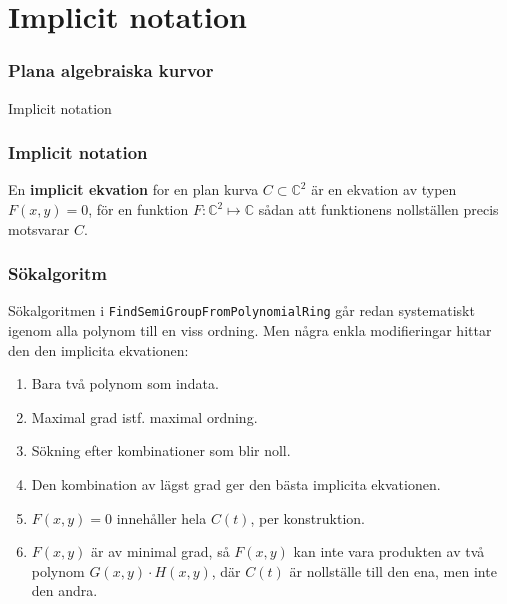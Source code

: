\documentclass{beamer}
\begin{document}
\section{Implicit notation}

\begin{frame}
	\frametitle{Plana algebraiska kurvor}
	\begin{center}
		\Large Implicit notation
	\end{center}
\end{frame}

\begin{frame}
	\frametitle{Implicit notation}
	
	\begin{definition}
		En \textbf{implicit ekvation} for en plan kurva $C \subset \mathbb{C}^2$ är en ekvation av typen $F(x,y)=0$, för en funktion $F: \mathbb{C}^2 \mapsto \mathbb{C}$ sådan att funktionens nollställen precis motsvarar $C$.
	\end{definition}
		
	\vspace{20pt}
\end{frame}

\begin{frame}
	\frametitle{Sökalgoritm}
	
	Sökalgoritmen i \texttt{FindSemiGroupFromPolynomialRing} går redan systematiskt igenom alla polynom till en viss ordning. Men några enkla modifieringar hittar den den implicita ekvationen:
	
	\begin{enumerate}
		\item<2->Bara två polynom som indata.
		\item<3->Maximal grad istf. maximal ordning.
		\item<4->Sökning efter kombinationer som blir noll.
		\item<5->Den kombination av lägst grad ger den bästa implicita ekvationen.
		\item<6->$F(x,y)=0$ innehåller hela $C(t)$, per konstruktion.
		\item<7->$F(x,y)$ är av minimal grad, så $F(x,y)$ kan inte vara produkten av två polynom $G(x,y)\cdot H(x,y)$, där $C(t)$ är nollställe till den ena, men inte den andra.
	\end{enumerate}
\end{frame}
\end{document}
